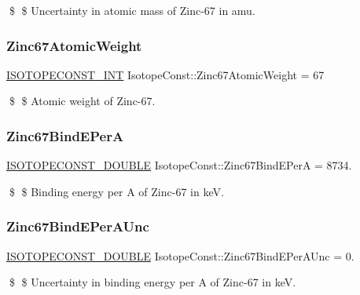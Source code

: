 \$ \$ Uncertainty in atomic mass of Zinc-\/67 in amu. \mbox{\label{group___isotope_const-_zinc-_zn67_gabd9ca273b67acfe3c811281e48625abc}} 
\subsubsection{\texorpdfstring{Zinc67\+Atomic\+Weight}{Zinc67AtomicWeight}}
{\footnotesize\ttfamily \mbox{\hyperlink{group___isotope_const-_macros_ga5f18360b3e99483a35c32d789e62621c}{I\+S\+O\+T\+O\+P\+E\+C\+O\+N\+S\+T\+\_\+\+I\+NT}} Isotope\+Const\+::\+Zinc67\+Atomic\+Weight = 67}

\$ \$ Atomic weight of Zinc-\/67. \mbox{\label{group___isotope_const-_zinc-_zn67_ga618d2f865442ec0f253f1b1a2ecf784a}} 
\subsubsection{\texorpdfstring{Zinc67\+Bind\+E\+PerA}{Zinc67BindEPerA}}
{\footnotesize\ttfamily \mbox{\hyperlink{group___isotope_const-_macros_ga8f45a7272ce02c0b4c65c44636ed719a}{I\+S\+O\+T\+O\+P\+E\+C\+O\+N\+S\+T\+\_\+\+D\+O\+U\+B\+LE}} Isotope\+Const\+::\+Zinc67\+Bind\+E\+PerA = 8734.}

\$ \$ Binding energy per A of Zinc-\/67 in keV. \mbox{\label{group___isotope_const-_zinc-_zn67_ga7876e01f19b78af7641616fa6794c24e}} 
\subsubsection{\texorpdfstring{Zinc67\+Bind\+E\+Per\+A\+Unc}{Zinc67BindEPerAUnc}}
{\footnotesize\ttfamily \mbox{\hyperlink{group___isotope_const-_macros_ga8f45a7272ce02c0b4c65c44636ed719a}{I\+S\+O\+T\+O\+P\+E\+C\+O\+N\+S\+T\+\_\+\+D\+O\+U\+B\+LE}} Isotope\+Const\+::\+Zinc67\+Bind\+E\+Per\+A\+Unc = 0.}

\$ \$ Uncertainty in binding energy per A of Zinc-\/67 in keV. \mbox{\label{group___isotope_const-_zinc-_zn67_gab667a379bf48b1e1b3b9b02327398ab8}} 
